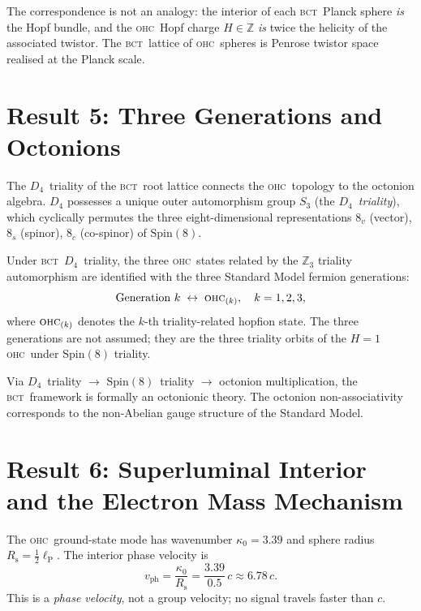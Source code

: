 \documentclass[aps,prl,preprint,superscriptaddress,floatfix]{revtex4-2}
\newcommand{\lP}{\ell_{\mathrm{P}}}
\newcommand{\BCT}{\textsc{bct}}
\newcommand{\OHC}{\textsc{ohc}}
\newcommand{\Rsph}{R_{\mathrm{s}}}
\newcommand{\kz}{\kappa_0}
\newcommand{\HopfN}{H}
\newcommand{\vph}{v_{\mathrm{ph}}}
\begin{document}
\medskip

\noindent
The correspondence is not an analogy: the interior of each \BCT\ Planck
sphere \emph{is} the Hopf bundle, and the \OHC\ Hopf charge
$\HopfN\in\mathbb{Z}$ \emph{is} twice the helicity of the associated
twistor.
The \BCT\ lattice of \OHC\ spheres is Penrose twistor space realised at
the Planck scale.

\section{Result 5: Three Generations and Octonions}
\label{sec:octonions}

The $D_4$~triality of the \BCT\ root lattice connects the \OHC\ topology
to the octonion algebra.
$D_4$ possesses a unique outer automorphism group $S_3$ (the
\emph{$D_4$~triality}), which cyclically permutes the three
eight-dimensional representations
$8_v$ (vector), $8_s$ (spinor), $8_c$ (co-spinor) of $\mathrm{Spin}(8)$.

Under \BCT\ $D_4$~triality, the three \OHC\ states related by the
$\mathbb{Z}_3$ triality automorphism are identified with the three
Standard Model fermion generations:
\begin{equation}
  \text{Generation } k \;\leftrightarrow\; \OHC_{(k)},
  \quad k = 1,2,3,
  \label{eq:generations}
\end{equation}
where $\OHC_{(k)}$ denotes the $k$-th triality-related hopfion state.
The three generations are not assumed; they are the three triality
orbits of the $\HopfN=1$ \OHC\ under $\mathrm{Spin}(8)$ triality.

Via $D_4$~triality $\to$ $\mathrm{Spin}(8)$~triality $\to$ octonion
multiplication, the \BCT\ framework is formally an octonionic theory.
The octonion non-associativity corresponds to the non-Abelian gauge
structure of the Standard Model.

\section{Result 6: Superluminal Interior and the Electron Mass Mechanism}
\label{sec:superluminal}

The \OHC\ ground-state mode has wavenumber $\kz = 3.39$ and sphere
radius $\Rsph = \tfrac{1}{2}\lP$.
The interior phase velocity is
\begin{equation}
  \vph = \frac{\kz}{\Rsph}
  = \frac{3.39}{0.5}\,c
  \approx 6.78\,c.
  \label{eq:phase-velocity}
\end{equation}
This is a \emph{phase velocity}, not a group velocity; no signal travels
faster than $c$.
\end{document}
